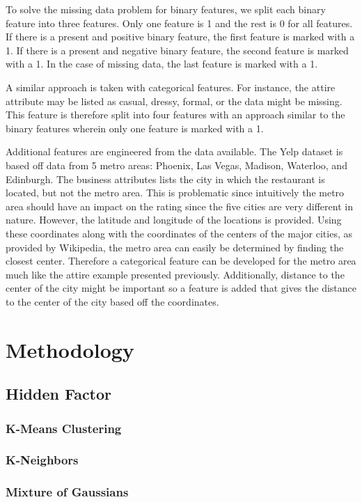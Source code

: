 \documentclass[11pt]{article}
\begin{document}
To solve the missing data problem for binary features, we split each binary feature into three features. Only one feature is 1 and the rest is 0 for all features. If there is a present and positive binary feature, the first feature is marked with a 1. If there is a present and negative binary feature, the second feature is marked with a 1. In the case of missing data, the last feature is marked with a 1. 

A similar approach is taken with categorical features. For instance, the attire attribute may be listed as casual, dressy, formal, or the data might be missing. This feature is therefore split into four features with an approach similar to the binary features wherein only one feature is marked with a 1.

Additional features are engineered from the data available. The Yelp dataset is based off data from 5 metro areas: Phoenix, Las Vegas, Madison, Waterloo, and Edinburgh. The business attributes lists the city in which the restaurant is located, but not the metro area. This is problematic since intuitively the metro area should have an impact on the rating since the five cities are very different in nature. However, the latitude and longitude of the locations is provided. Using these coordinates along with the coordinates of the centers of the major cities, as provided by Wikipedia, the metro area can easily be determined by finding the closest center. Therefore a categorical feature can be developed for the metro area much like the attire example presented previously. Additionally, distance to the center of the city might be important so a feature is added that gives the distance to the center of the city based off the coordinates.

\section{Methodology}
\subsection{Hidden Factor}
\subsubsection{K-Means Clustering}
\subsubsection{K-Neighbors}
\subsubsection{Mixture of Gaussians}
\end{document}
